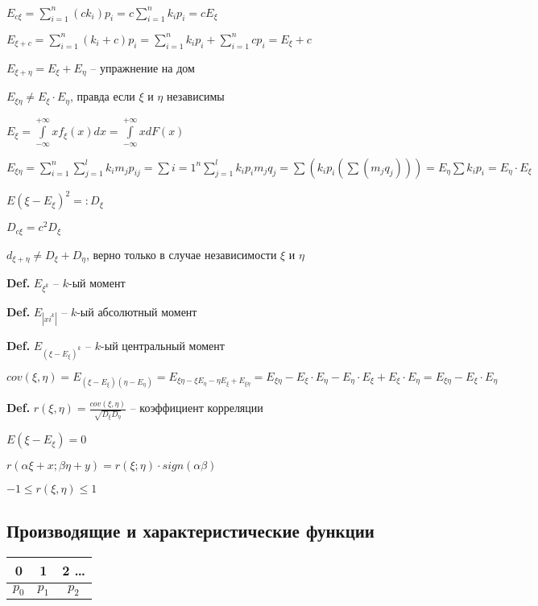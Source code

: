 \documentclass[14pt, letter paper]{article}
\begin{document}
$E_{c\xi} = \sum\limits_{i=1}^n (c k_i)p_i = c\sum\limits_{i=1}^n k_i p_i = c E_\xi$

$E_{\xi + c} = \sum\limits_{i=1}^n (k_i + c) p_i = \sum\limits_{i=1}^n k_i p_i + \sum\limits_{i=1}^n c p_i = E_\xi + c$

$E_{\xi + \eta} = E_\xi + E_\eta$ -- упражнение на дом

$E_{\xi\eta} \neq E_\xi \cdot E_\eta$, правда если $\xi$ и $\eta$ независимы

$E_\xi = \int\limits_{-\infty}^{+\infty} xf_\xi(x)dx = \int\limits_{-\infty}^{+\infty} xdF(x)$

$E_{\xi\eta} = \sum\limits_{i=1}^n\sum\limits_{j=1}^l k_im_jp_{ij} = \sum\limits{i=1}^n \sum\limits_{j=1}^l k_ip_i m_jq_j = \sum(k_ip_i(\sum(m_jq_j))) = E_\eta \sum k_ip_i = E_\eta \cdot E_\xi$

$E(\xi - E_\xi)^2 =: D_\xi$

$D_{c\xi} = c^2 D_\xi$

$d_{\xi + \eta} \neq D_\xi + D_\eta$, верно только в случае независимости $\xi$ и $\eta$

\textbf{Def.} $E_{\xi^k}$ -- $k$-ый момент

\textbf{Def.} $E_{|xi^k|}$ -- $k$-ый абсолютный момент

\textbf{Def.} $E_{(\xi - E_\xi)^k}$ -- $k$-ый центральный момент

$cov(\xi, \eta) = E_{(\xi - E_\xi)(\eta - E_\eta)} = E_{\xi\eta - \xi E_\eta - \eta E_\xi + E_{\xi\eta}} = E_{\xi\eta} - E_\xi \cdot E_\eta - E_\eta \cdot E_\xi + E_\xi \cdot E_\eta = E_{\xi\eta} - E_\xi \cdot E_\eta$

\textbf{Def.} $r(\xi, \eta) = \frac{cov(\xi, \eta)}{\sqrt{D_\xi D_\eta}}$ -- коэффициент корреляции

$E(\xi - E_\xi) = 0$

$r(\alpha\xi + x; \beta\eta + y) = r(\xi;\eta) \cdot sign(\alpha\beta)$

$-1 \leq r(\xi, \eta) \leq 1$

\begin{center}
    \subsection*{Производящие и характеристические функции}
\end{center}

\begin{center}
    \begin{tabular}{c | c | c}
        0 & 1 & 2 \ldots \\
        \hline 
        $p_0$ & $p_1$ & $p_2$
    \end{tabular}
\end{center}
\end{document}
